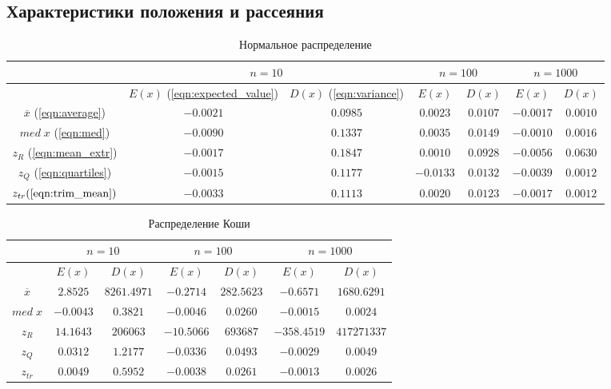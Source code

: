 \documentclass[12pt,a4paper]{article}
\begin{document}
	\subsection{Характеристики положения и рассеяния}
	\begin{center}
		\begin{table}[h]
			\caption{Нормальное распределение}
			\begin{center}
				\begin{tabular}{|c|c|c|c|c|c|c|}
					\hline
					& \multicolumn{2}{c|}{$n=10$} & \multicolumn{2}{c|}{$n=100$} & \multicolumn{2}{c|}{$n=1000$}\\
					\hline
					 & $E(x)$ (\ref{eqn:expected_value}) & $D(x)$ (\ref{eqn:variance}) & $E(x)$ & $D(x)$ & $E(x)$ & $D(x)$\\
					\hline
					$\overline{x}$ (\ref{eqn:average}) & $-0.0021$ & $0.0985$ & $0.0023$ & $0.0107$ & $-0.0017$ & $0.0010$\\
					\hline
					$med\;x$ (\ref{eqn:med}) & $-0.0090$ & $0.1337$ & $0.0035$ & $0.0149$ & $-0.0010$ & $0.0016$\\
					\hline
					$z_R$ (\ref{eqn:mean_extr}) & $-0.0017$ & $0.1847$ & $0.0010$ & $0.0928$ & $-0.0056$ & $0.0630$\\
					\hline
					$z_Q$ (\ref{eqn:quartiles}) & $-0.0015$ & $0.1177$ & $-0.0133$ & $0.0132$ & $-0.0039$ & $0.0012$\\
					\hline
					$z_{tr} (\ref{eqn:trim_mean}) $ & $-0.0033$ & $0.1113$ & $0.0020$ & $0.0123$ & $-0.0017$ & $0.0012$\\
					\hline
				\end{tabular}
			\end{center}
		\end{table}
	
		\begin{table}[h]
			\caption{Распределение Коши}
			\begin{center}
				\begin{tabular}{|c|c|c|c|c|c|c|}
					\hline
					& \multicolumn{2}{c|}{$n=10$} & \multicolumn{2}{c|}{$n=100$} & \multicolumn{2}{c|}{$n=1000$}\\
					\hline
					& $E(x)$ & $D(x)$ & $E(x)$ & $D(x)$ & $E(x)$ & $D(x)$\\
					\hline
					$\overline{x}$ & $2.8525$ & $8261.4971$ & $-0.2714$ & $282.5623$ & $-0.6571$ & $1680.6291$\\
					\hline
					$med\;x$ & $-0.0043$ & $0.3821$ & $-0.0046$ & $0.0260$ & $-0.0015$ & $0.0024$\\
					\hline
					$z_R$ & $14.1643$ & $206063$ & $-10.5066$ & $693687$ & $-358.4519$ & $417271337$\\
					\hline
					$z_Q$ & $0.0312$ & $1.2177$ & $-0.0336$ & $0.0493$ & $-0.0029$ & $0.0049$\\
					\hline
					$z_{tr}$ & $0.0049$ & $0.5952$ & $-0.0038$ & $0.0261$ & $-0.0013$ & $0.0026$\\
					\hline
				\end{tabular}
			\end{center}
		\end{table}
	

\end{center}
\end{document}
